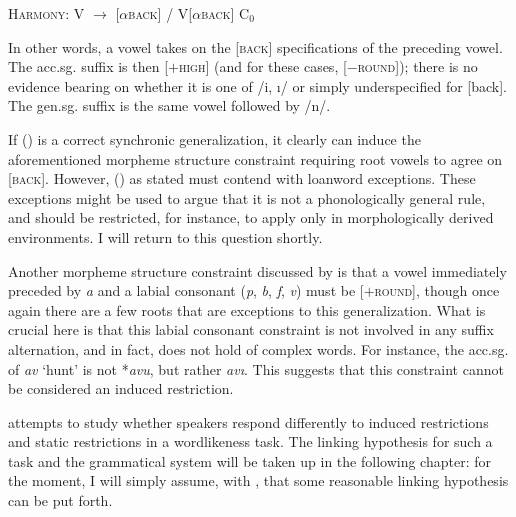 \ex {} \textsc{Harmony}: %
V $\rightarrow$ [$\alpha$\textsc{back}] / V[$\alpha$\textsc{back}] C$_0$ \gap\gap \xe

In other words, a vowel takes on the [\textsc{back}] specifications of the preceding vowel. The acc.sg. suffix is then [$+$\textsc{high}] (and for these cases, [$-$\textsc{round}]); there is no evidence bearing on whether it is one of /i, ı/ or simply underspecified for [back]. The gen.sg. suffix is the same vowel followed by /n/. 

If (\lastx) is a correct synchronic generalization, it clearly can induce the aforementioned morpheme structure constraint requiring root vowels to agree on [\textsc{back}]. However, (\lastx) as stated must contend with loanword exceptions. These exceptions might be used to argue that it is not a phonologically general rule, and should be restricted, for instance, to apply only in morphologically derived environments. I will return to this question shortly. 

Another morpheme structure constraint discussed by \citeauthor{Zimmer1969} is that a vowel immediately preceded by \emph{a} and a labial consonant (\emph{p}, \emph{b}, \emph{f}, \emph{v}) must be [$+$\textsc{round}], though once again there are a few roots that are exceptions to this generalization. What is crucial here is that this labial consonant constraint is not involved in any suffix alternation, and in fact, does not hold of complex words. For instance, the acc.sg. of \emph{av} `hunt' is not *\emph{avu}, but rather \emph{avı}. This suggests that this constraint cannot be considered an induced restriction.

\citeauthor{Zimmer1969} attempts to study whether speakers respond differently to induced restrictions and static restrictions in a wordlikeness task. The linking hypothesis for such a task and the grammatical system will be taken up in the following chapter: for the moment, I will simply assume, with \citeauthor{Zimmer1969}, that some reasonable linking hypothesis can be put forth. 


